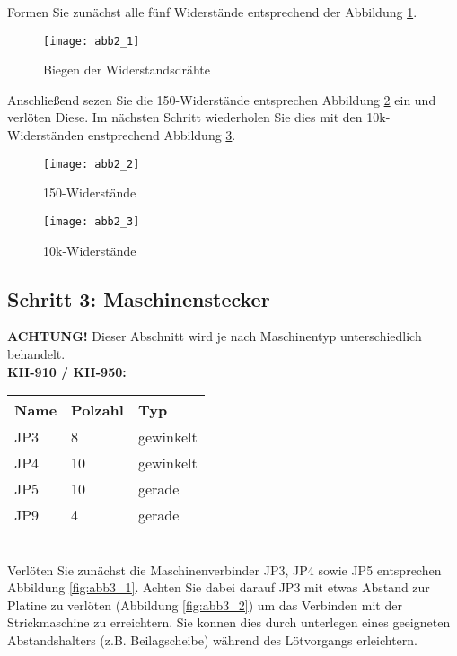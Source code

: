 \documentclass[fleqn,10pt]{SelfArx} %
\begin{document}
Formen Sie zunächst alle fünf Widerstände entsprechend der Abbildung \ref{fig:abb2_1}.

\begin{figure}[tbhp]\centering
\texttt{[image: abb2\_1]}
\caption{Biegen der Widerstandsdrähte}
\label{fig:abb2_1}
\end{figure}

Anschließend sezen Sie die 150\textOmega-Widerstände entsprechen Abbildung \ref{fig:abb2_2} ein und verlöten Diese. Im nächsten Schritt wiederholen Sie dies mit den 10k\textOmega-Widerständen enstprechend Abbildung \ref{fig:abb2_3}.

\begin{figure}[tbhp]\centering
\texttt{[image: abb2\_2]}
\caption{150\textOmega-Widerstände}
\label{fig:abb2_2}
\end{figure}

\begin{figure}[tbhp]\centering
\texttt{[image: abb2\_3]}
\caption{10k\textOmega-Widerstände}
\label{fig:abb2_3}
\end{figure}

\FloatBarrier

 \subsection*{Schritt 3: Maschinenstecker}

\textbf{ACHTUNG!} Dieser Abschnitt wird je nach Maschinentyp unterschiedlich behandelt.\\

\textbf{KH-910 / KH-950:} \\

\begin{tabular}{lll}
\hline
\textbf{Name} & \textbf{Polzahl}  & \textbf{Typ} \\ \hline
JP3           & 8                 & gewinkelt    \\ \hline
JP4           & 10                & gewinkelt    \\ \hline
JP5           & 10                & gerade       \\ \hline
JP9           & 4                 & gerade       \\ \hline
\end{tabular}\\

Verlöten Sie zunächst die Maschinenverbinder JP3, JP4 sowie JP5 entsprechen Abbildung \ref{fig:abb3_1}. Achten Sie dabei darauf JP3 mit etwas Abstand zur Platine zu verlöten (Abbildung \ref{fig:abb3_2}) um das Verbinden mit der Strickmaschine zu erreichtern. Sie konnen dies durch unterlegen eines geeigneten Abstandshalters (z.B. Beilagscheibe) während des Lötvorgangs erleichtern.
\end{document}

